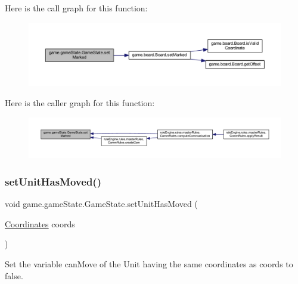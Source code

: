 Here is the call graph for this function\+:
\nopagebreak
\begin{figure}[H]
\begin{center}
\leavevmode
\includegraphics[width=350pt]{classgame_1_1game_state_1_1_game_state_a2b96db554e56b41714d9ff4cffed5fbc_cgraph}
\end{center}
\end{figure}
Here is the caller graph for this function\+:
\nopagebreak
\begin{figure}[H]
\begin{center}
\leavevmode
\includegraphics[width=350pt]{classgame_1_1game_state_1_1_game_state_a2b96db554e56b41714d9ff4cffed5fbc_icgraph}
\end{center}
\end{figure}
\mbox{\label{classgame_1_1game_state_1_1_game_state_adbe937aae18d5146f28e3cd181c54515}} 
\subsubsection{\texorpdfstring{set\+Unit\+Has\+Moved()}{setUnitHasMoved()}}
{\footnotesize\ttfamily void game.\+game\+State.\+Game\+State.\+set\+Unit\+Has\+Moved (\begin{DoxyParamCaption}\item[{\mbox{\hyperlink{classrule_engine_1_1_coordinates}{Coordinates}}}]{coords }\end{DoxyParamCaption})\hspace{0.3cm}{\ttfamily [inline]}}

Set the variable can\+Move of the Unit having the same coordinates as coords to false.



